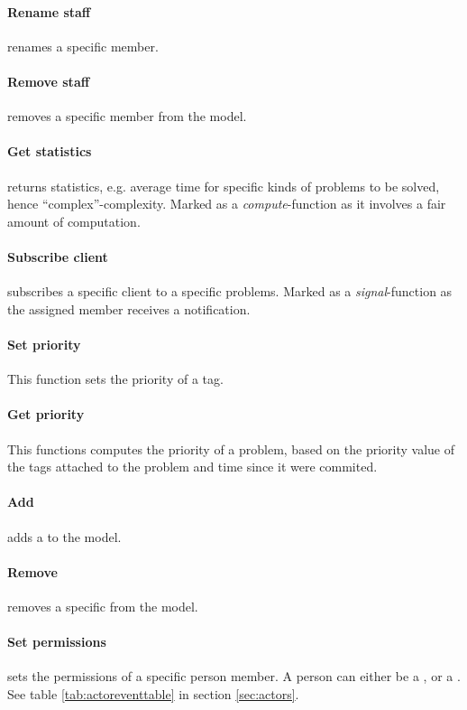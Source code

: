 \paragraph{Rename staff} renames a specific \astaff[] member. 

\paragraph{Remove staff} removes a specific \astaff[] member from the model. 


\paragraph{Get statistics} returns statistics, e.g. average time for specific kinds of problems to be solved, hence ``complex''-complexity. Marked as a \textit{compute}-function as it involves a fair amount of computation.
\paragraph{Subscribe client} subscribes a specific client to a specific problems. Marked as a \textit{signal}-function as the assigned \astaff[] member receives a notification. 

\paragraph{Set priority} This function sets the priority of a tag. 

\paragraph{Get priority} This functions computes the priority of a problem, based on the priority value of the tags attached to the problem and time since it were commited.

\paragraph{Add \client[]} adds a \client[] to the model. 

\paragraph{Remove \client[]} removes a specific \client[] from the model. 

\paragraph{Set permissions} sets the permissions of a specific person member. A person can either be a \aclient[], \astaff[] or a \admin[]. See table \ref{tab:actoreventtable} in section \ref{sec:actors}.
